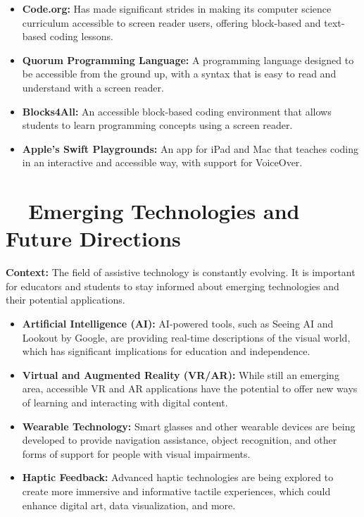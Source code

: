 \begin{itemize}
	\item \textbf{Code.org:} Has made significant strides in making its computer science curriculum accessible to screen reader users, offering block-based and text-based coding lessons.
	\item \textbf{Quorum Programming Language:} A programming language designed to be accessible from the ground up, with a syntax that is easy to read and understand with a screen reader.
	\item \textbf{Blocks4All:} An accessible block-based coding environment that allows students to learn programming concepts using a screen reader.
	\item \textbf{Apple's Swift Playgrounds:} An app for iPad and Mac that teaches coding in an interactive and accessible way, with support for VoiceOver.
\end{itemize}

\section{~~Emerging Technologies and Future Directions}\label{app4:emerging-tech}

\noindent
\textbf{Context:} The field of assistive technology is constantly evolving. It is important for educators and students to stay informed about emerging technologies and their potential applications.

\begin{itemize}
	\item \textbf{Artificial Intelligence (AI):} AI-powered tools, such as Seeing AI and Lookout by Google, are providing real-time descriptions of the visual world, which has significant implications for education and independence.
	\item \textbf{Virtual and Augmented Reality (VR/AR):} While still an emerging area, accessible VR and AR applications have the potential to offer new ways of learning and interacting with digital content.
	\item \textbf{Wearable Technology:} Smart glasses and other wearable devices are being developed to provide navigation assistance, object recognition, and other forms of support for people with visual impairments.
	\item \textbf{Haptic Feedback:} Advanced haptic technologies are being explored to create more immersive and informative tactile experiences, which could enhance digital art, data visualization, and more.
\end{itemize}
